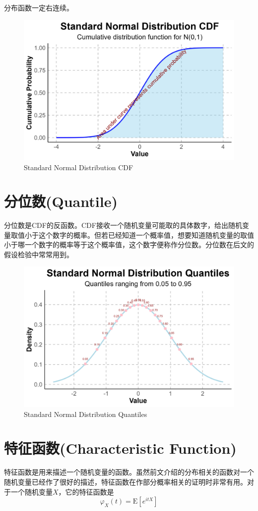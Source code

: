 \documentclass[UTF8]{ctexbook}
\begin{document}
分布函数一定右连续。

\newpage %
\begin{figure}[ht]
	\centering
	\includegraphics[width=0.6\linewidth]{Figures/SND_CDF.jpg}
	\caption{Standard Normal Distribution CDF}
	\label{fig:StNor_CDF}
\end{figure}

\section{分位数(Quantile)}
分位数是CDF的反函数。CDF接收一个随机变量可能取的具体数字，给出随机变量取值小于这个数字的概率。但若已经知道一个概率值，想要知道随机变量的取值小于哪一个数字的概率等于这个概率值，这个数字便称作分位数。分位数在后文的假设检验中常常用到。

\begin{figure}[ht]
	\centering
	\includegraphics[width=0.6\linewidth]{Figures/SND_quan.jpg}
	\caption{Standard Normal Distribution Quantiles}
	\label{fig:StNor_quan}
\end{figure}

\section{特征函数(Characteristic Function)}
\label{characteristic-function}
特征函数是用来描述一个随机变量的函数。虽然前文介绍的分布相关的函数对一个随机变量已经作了很好的描述，特征函数在作部分概率相关的证明时非常有用。对于一个随机变量$X$，它的特征函数是
\[
	\varphi_X(t)=\mathrm E[e^{itX}]
\]
\end{document}
